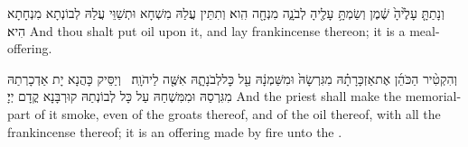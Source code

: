 {וְנָתַתָּ֤ עָלֶ֙יהָ֙ שֶׁ֔מֶן וְשַׂמְתָּ֥ עָלֶ֖יהָ לְבֹנָ֑ה מִנְחָ֖ה הִֽוא׃}
{וְתִתֵּין עֲלַהּ מִשְׁחָא וּתְשַׁוֵּי עֲלַהּ לְבוֹנְתָא מִנְחָתָא הִיא׃}
{And thou shalt put oil upon it, and lay frankincense thereon; it is a meal-offering.}{}

{וְהִקְטִ֨יר הַכֹּהֵ֜ן אֶת\maqqaf אַזְכָּרָתָ֗הּ מִגִּרְשָׂהּ֙ וּמִשַּׁמְנָ֔הּ עַ֖ל כׇּל\maqqaf לְבֹנָתָ֑הּ אִשֶּׁ֖ה לַיהֹוָֽה׃ \petucha }
{וְיַסֵּיק כָּהֲנָא יָת אַדְכָרְתַהּ מִגִּרְסַהּ וּמִמִּשְׁחַהּ עַל כָּל לְבוֹנְתַהּ קוּרְבָּנָא קֳדָם יְיָ׃}
{And the priest shall make the memorial-part of it smoke, even of the groats thereof, and of the oil thereof, with all the frankincense thereof; it is an offering made by fire unto the \lord.}{}

